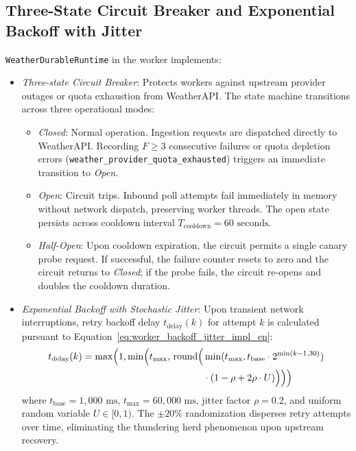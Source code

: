 \subsection{Three-State Circuit Breaker and Exponential Backoff with Jitter}
\texttt{WeatherDurableRuntime} in the worker implements:
\begin{itemize}
    \item[-] \textit{Three-state Circuit Breaker}: Protects workers against upstream provider outages or quota exhaustion from WeatherAPI. The state machine transitions across three operational modes:
    \begin{itemize}
        \item[+] \textit{Closed}: Normal operation. Ingestion requests are dispatched directly to WeatherAPI. Recording $F \ge 3$ consecutive failures or quota depletion errors (\texttt{weather\_provider\_quota\_exhausted}) triggers an immediate transition to \textit{Open}.
        \item[+] \textit{Open}: Circuit trips. Inbound poll attempts fail immediately in memory without network dispatch, preserving worker threads. The open state persists across cooldown interval $T_{\text{cooldown}} = 60\text{ seconds}$.
        \item[+] \textit{Half-Open}: Upon cooldown expiration, the circuit permits a single canary probe request. If successful, the failure counter resets to zero and the circuit returns to \textit{Closed}; if the probe fails, the circuit re-opens and doubles the cooldown duration.
    \end{itemize}
    \item[-] \textit{Exponential Backoff with Stochastic Jitter}: Upon transient network interruptions, retry backoff delay $t_{\text{delay}}(k)$ for attempt $k$ is calculated pursuant to Equation~\eqref{eq:worker_backoff_jitter_impl_en}:
    \begin{equation}
    \label{eq:worker_backoff_jitter_impl_en}
    \begin{aligned}
    t_{\text{delay}}(k) = \max\Bigl(1, \min\Bigl(t_{\max}, \, \text{round}\Bigl(&\min(t_{\max}, t_{\text{base}} \cdot 2^{\min(k-1, 30)}) \\
    &\cdot (1 - \rho + 2\rho \cdot U)\Bigr)\Bigr)\Bigr)
    \end{aligned}
    \end{equation}
    where $t_{\text{base}} = 1,000\text{ ms}$, $t_{\max} = 60,000\text{ ms}$, jitter factor $\rho = 0.2$, and uniform random variable $U \in [0, 1)$. The $\pm 20\%$ randomization disperses retry attempts over time, eliminating the thundering herd phenomenon upon upstream recovery.
\end{itemize}

